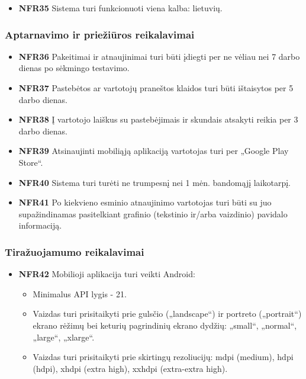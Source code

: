 \documentclass{VUMIFPSbakalaurinis}
\begin{document}
\begin{itemize}
	\item \textbf{NFR35} Sistema turi funkcionuoti viena kalba: lietuvių.
\end{itemize}

\subsubsection{Aptarnavimo ir priežiūros reikalavimai}
\begin{itemize}
	\item \textbf{NFR36} Pakeitimai ir atnaujinimai turi būti įdiegti per ne vėliau nei 7 darbo dienas po sėkmingo testavimo.
	\item \textbf{NFR37} Pastebėtos ar vartotojų praneštos klaidos turi būti ištaisytos per 5 darbo dienas.
	\item \textbf{NFR38} Į vartotojo laiškus su pastebėjimais ir skundais atsakyti reikia per 3 darbo dienas.
	\item \textbf{NFR39} Atsinaujinti mobiliąją aplikaciją vartotojas turi per „Google Play Store“.
	\item \textbf{NFR40} Sistema turi turėti ne trumpesnį nei 1 mėn. bandomąjį laikotarpį.
	\item \textbf{NFR41} Po kiekvieno esminio atnaujinimo vartotojas turi būti su juo supažindinamas pasitelkiant grafinio (tekstinio ir/arba vaizdinio) pavidalo informaciją.
\end{itemize}

\subsubsection{Tiražuojamumo reikalavimai}
\begin{itemize}
	\item \textbf{NFR42} Mobilioji aplikacija turi veikti Android:
	\begin{itemize}
		\item Minimalus API lygis - 21.
		\item Vaizdas turi prisitaikyti prie gulsčio („landscape“) ir portreto („portrait“) ekrano rėžimų bei keturių pagrindinių ekrano dydžių: „small“, „normal“, „large“, „xlarge“.
		\item Vaizdas turi prisitaikyti prie skirtingų rezoliucijų: mdpi (medium), hdpi (hdpi), xhdpi (extra high), xxhdpi (extra-extra high).
	\end{itemize}
\end{itemize}
\end{document}
